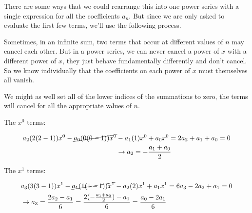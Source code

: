 \documentclass[paper=a4, fontsize=11pt]{scrartcl} %
\numberwithin{equation}{section} %
\numberwithin{figure}{section} %
\numberwithin{table}{section} %
\begin{document}




There are some ways that we could rearrange this into one power series with a single expression for all the coefficients $a_n$. But since we are only asked to evaluate the first few terms, we'll use the following process. 

\hspace{2mm}

Sometimes, in an infinite sum, two terms that occur at different values of $n$ may cancel each other. But in a power series, we can never cancel a power of $x$ with a different power of $x$, they just behave fundamentally differently and don't cancel. So we know individually that the coefficients on each power of $x$ must themselves all vanish. 

\hspace{2mm}

We might as well set all of the lower indices of the summations to zero, the terms will cancel for all the appropriate values of $n$. 

\hspace{2mm}

The $x^0$ terms:

\begin{align}
a_2(2(2-1))x^0 - \cancel{a_0(0(0-1))x^0} &- a_1(1)x^0 + a_0x^0 = 2a_2 + a_1 +  a_0 = 0 \\
&\rightarrow a_2 = -\frac{a_1 + a_0}{2}
\end{align}

The $x^1$ terms:

\begin{align}
&a_3(3(3-1))x^1 - \cancel{a_1(1(1-1))x^1} - a_2(2)x^1 + a_1 x^1 = 6a_3 - 2 a_2 + a_1 = 0 \\
&\rightarrow a_3 = \frac{2a_2 - a_1}{6} = \frac{2 (-\frac{a_1 + a_0}{2}) - a_1}{6} = \frac{a_0 - 2 a_1}{6}
\end{align}
\end{document}
